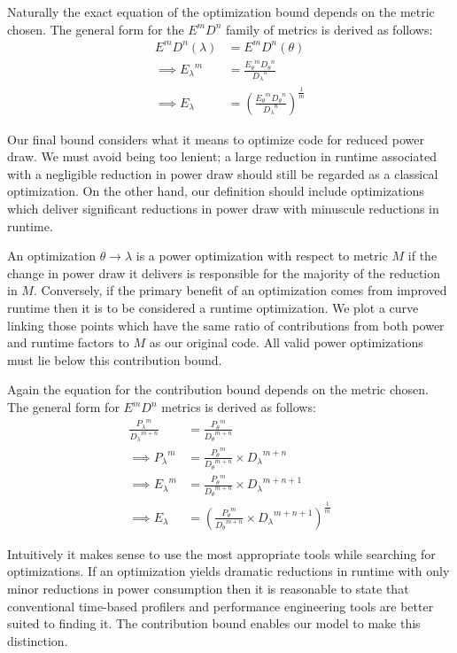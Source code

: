 Naturally the exact equation of the optimization bound depends on the metric chosen. 
The general form for the $E^mD^n$ family of metrics is derived as follows:
\begin{align}
E^mD^n(\lambda) &= E^mD^n(\theta) \nonumber \\
\implies {E_\lambda}^m &= \frac{{E_\theta}^m{D_\theta}^n}{{D_\lambda}^n} \nonumber \\
\implies E_\lambda &= (\frac{{E_\theta}^m{D_\theta}^n}{{D_\lambda}^n})^\frac{1}{m}
\end{align}

Our final bound considers what it means to optimize code for reduced power draw. We must avoid being too lenient; a large reduction in runtime associated with a negligible reduction in power draw should still be regarded as a classical optimization. On the other hand, our definition should include optimizations which deliver significant reductions in power draw with minuscule reductions in runtime. 

An optimization $\theta \to \lambda$ is a power optimization with respect to metric $M$ if the change in power draw it delivers is responsible for the majority of the reduction in $M$. Conversely, if the primary benefit of an optimization comes from improved runtime then it is to be considered a runtime optimization. We plot a curve linking those points which have the same ratio of contributions from both power and runtime factors to $M$ as our original code. All valid power optimizations must lie below this contribution bound. 

Again the equation for the contribution bound depends on the metric chosen.
The general form for $E^mD^n$ metrics is derived as follows:
\begin{align}
\frac{{P_{\lambda}}^m}{{D_{\lambda}}^{m+n}} &= \frac{{P_{\theta}}^m}{{D_{\theta}}^{m+n}} \nonumber \\
\implies {P_{\lambda}}^m &= \frac{{P_{\theta}}^m}{{D_{\theta}}^{m+n}} \times {D_\lambda}^{m+n} \nonumber \\ 
\implies {E_{\lambda}}^m &= \frac{{P_{\theta}}^m}{{D_{\theta}}^{m+n}} \times {D_\lambda}^{m+n+1} \nonumber \\ 
\implies E_{\lambda} &= (\frac{{P_{\theta}}^m}{{D_{\theta}}^{m+n}} \times {D_\lambda}^{m+n+1})^{\frac{1}{m}} 
\end{align}

Intuitively it makes sense to use the most appropriate tools while searching for optimizations.  If an optimization yields dramatic reductions in runtime with only minor reductions in power consumption then it is reasonable to state that conventional time-based profilers and performance engineering tools are better suited to finding it. The contribution bound enables our model to make this distinction.

